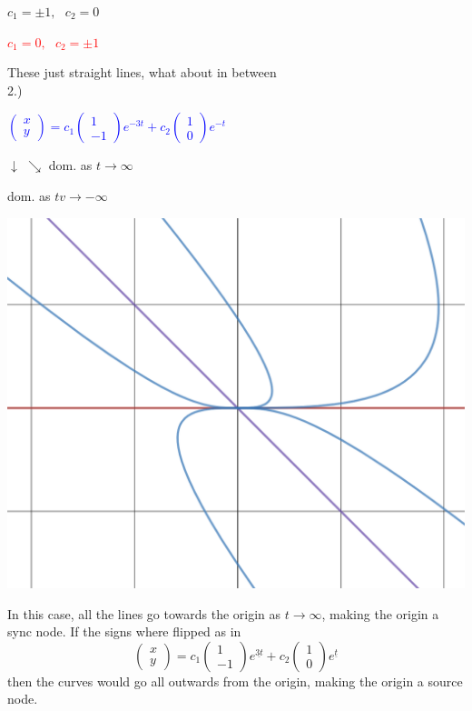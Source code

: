 \documentclass[12pt]{article}
\numberwithin{equation}{subsection}
\newcommand{\indb}{\hspace{1cm}}
\newcommand{\indd}{\hspace{2cm}}
\newcommand{\indf}{\hspace{3cm}}
\newcommand{\indh}{\hspace{4cm}}
\begin{document}
\indd \textcolor{purpleheart}{$c_1=\pm 1, \ \ \ c_2=0$}

\indd \textcolor{red}{$c_1=0, \ \ \ c_2=\pm 1$}


\indf These just straight lines, what about in between\\

\indb 2.)\textcolor{blue}{\begin{small}
$ \begin{pmatrix}
x \\ y
\end{pmatrix}=c_1\begin{pmatrix}
1 \\ -1
\end{pmatrix}e^{-3t}+c_2\begin{pmatrix}
1 \\ 0
\end{pmatrix}e^{-t}$
\end{small}}

\indh $\downarrow$ \indd $\searrow$ dom. as $t \rightarrow \infty$

\indh dom. as $tv \rightarrow -\infty$\\

\begin{center} \includegraphics[scale=.25]{sketch1} \end{center}

In this case, all the lines go towards the origin as $t \rightarrow \infty$, making the origin a sync node. If the signs where flipped as in 
\begin{equation}
\begin{pmatrix}
x \\ y
\end{pmatrix}=c_1\begin{pmatrix}
1 \\ -1
\end{pmatrix}e^{\underline{3t}}+c_2\begin{pmatrix}
1 \\ 0
\end{pmatrix}e^{\underline{t}}
\end{equation}
then the curves would go all outwards from the origin, making the origin a source node.
\end{document}
